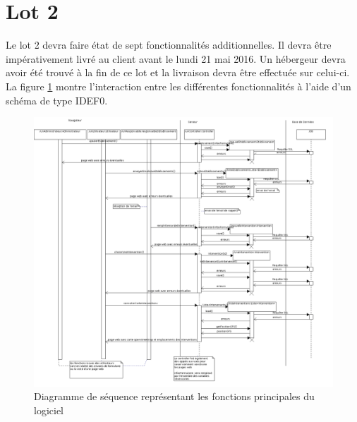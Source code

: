 \section{Lot 2}
	Le lot 2 devra faire état de sept fonctionnalités additionnelles. Il devra être impérativement livré au client avant le lundi 21 mai 2016. Un hébergeur devra avoir été trouvé à la fin de ce lot et la livraison devra être effectuée sur celui-ci.\\
	
	La figure \ref{fonctPrinc} montre l’interaction entre les différentes fonctionnalités à l'aide d'un schéma de type IDEF0.

\begin{figure}[!h]
	\begin{center}
	\includegraphics[scale=0.3]{images/fonctionsPrincipales.png}
	\caption{\label{fonctPrinc} Diagramme de séquence représentant les fonctions principales du logiciel}
	\end{center}
\end{figure}
















 



